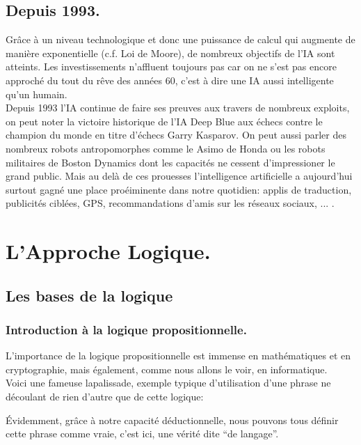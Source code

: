 \documentclass[a4paper, 12pt]{article}
\numberwithin{equation}{subsection}
\begin{document}
\subsection{Depuis 1993.}
Grâce à un niveau technologique et donc une puissance de calcul qui augmente de manière exponentielle (c.f. Loi de Moore), de nombreux objectifs de l'IA sont atteints. Les investissements n'affluent toujours pas car on ne s'est pas encore approché du tout du rêve des années 60, c'est à dire une IA aussi intelligente qu'un humain.\\

Depuis 1993 l'IA continue de faire ses preuves aux travers de nombreux exploits, on peut noter la victoire historique de l'IA Deep Blue aux échecs contre le champion du monde en titre d'échecs Garry Kasparov. On peut aussi parler des nombreux robots antropomorphes comme le Asimo de Honda ou les robots militaires de Boston Dynamics dont les capacités ne cessent d'impressioner le grand public. Mais au delà de ces prouesses l'intelligence artificielle a aujourd'hui surtout gagné une place proéiminente dans notre quotidien: applis de traduction, publicités ciblées, GPS, recommandations d'amis sur les réseaux sociaux, ... .

\section{L'Approche Logique.}
\subsection{Les bases de la logique}
  \subsubsection{Introduction à la logique propositionnelle.}
     L'importance de la logique propositionnelle est immense en mathématiques et en cryptographie, mais également, comme nous allons le voir, en informatique.\\
     Voici une fameuse lapalissade, exemple typique d'utilisation d'une phrase ne découlant de rien d'autre que de cette logique:
  \begin{center}
     
  \end{center}
     Évidemment, grâce à notre capacité déductionnelle, nous pouvons tous définir cette phrase comme vraie, c'est ici, une vérité dite ``de  langage''. \\[0.5cm]
\end{document}

